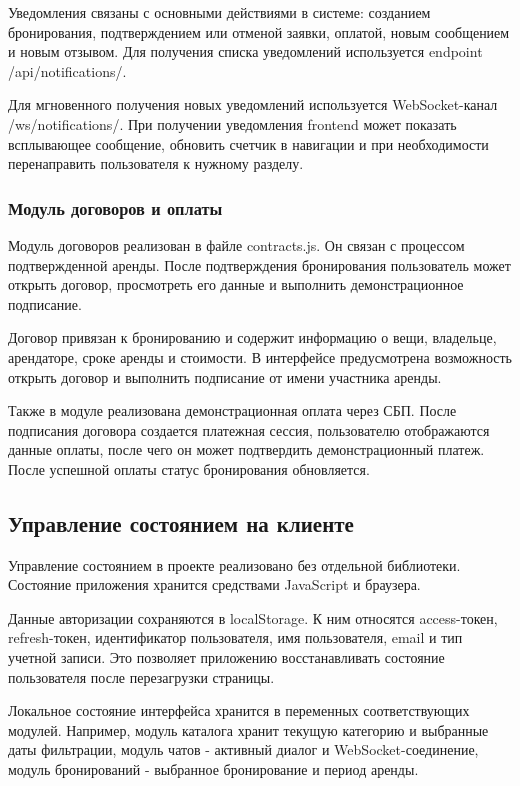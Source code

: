 Уведомления связаны с основными действиями в системе: созданием бронирования, подтверждением или отменой заявки, оплатой, новым сообщением и новым отзывом. Для получения списка уведомлений используется endpoint /api/notifications/.

Для мгновенного получения новых уведомлений используется WebSocket-канал /ws/notifications/. При получении уведомления frontend может показать всплывающее сообщение, обновить счетчик в навигации и при необходимости перенаправить пользователя к нужному разделу.

\subsubsection{Модуль договоров и оплаты}

Модуль договоров реализован в файле contracts.js. Он связан с процессом подтвержденной аренды. После подтверждения бронирования пользователь может открыть договор, просмотреть его данные и выполнить демонстрационное подписание.

Договор привязан к бронированию и содержит информацию о вещи, владельце, арендаторе, сроке аренды и стоимости. В интерфейсе предусмотрена возможность открыть договор и выполнить подписание от имени участника аренды.

Также в модуле реализована демонстрационная оплата через СБП. После подписания договора создается платежная сессия, пользователю отображаются данные оплаты, после чего он может подтвердить демонстрационный платеж. После успешной оплаты статус бронирования обновляется.

\subsection{Управление состоянием на клиенте}

Управление состоянием в проекте реализовано без отдельной библиотеки. Состояние приложения хранится средствами JavaScript и браузера.

Данные авторизации сохраняются в localStorage. К ним относятся access-токен, refresh-токен, идентификатор пользователя, имя пользователя, email и тип учетной записи. Это позволяет приложению восстанавливать состояние пользователя после перезагрузки страницы.

Локальное состояние интерфейса хранится в переменных соответствующих модулей. Например, модуль каталога хранит текущую категорию и выбранные даты фильтрации, модуль чатов - активный диалог и WebSocket-соединение, модуль бронирований - выбранное бронирование и период аренды.

